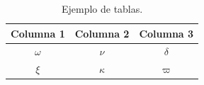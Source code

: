 	\begin{table}[H]
		\centering
		\caption{Ejemplo de tablas.}
		\begin{tabular}{ccc}
			\hline
			\textbf{Columna 1} & \textbf{Columna 2} & \textbf{Columna 3} \bigstrut\\
			\hline
			$\omega$ & $\nu$ & $\delta$ \bigstrut[t]\\
			$\xi$ & $\kappa$ & $\varpi$ \bigstrut[b] \\
			\hline
		\end{tabular}
		\label{tab:tabla-1}
	\end{table}





\clearpage
